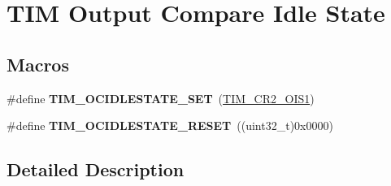 \hypertarget{group___t_i_m___output___compare___idle___state}{}\section{T\+IM Output Compare Idle State}
\label{group___t_i_m___output___compare___idle___state}
\subsection*{Macros}
\begin{DoxyCompactItemize}
\item 
\#define {\bfseries T\+I\+M\+\_\+\+O\+C\+I\+D\+L\+E\+S\+T\+A\+T\+E\+\_\+\+S\+ET}~(\hyperlink{group___peripheral___registers___bits___definition_ga31b26bf058f88d771c33aff85ec89358}{T\+I\+M\+\_\+\+C\+R2\+\_\+\+O\+I\+S1})\hypertarget{group___t_i_m___output___compare___idle___state_gad251b83b0e33ddd0ed2fb35aa747ef78}{}\label{group___t_i_m___output___compare___idle___state_gad251b83b0e33ddd0ed2fb35aa747ef78}

\item 
\#define {\bfseries T\+I\+M\+\_\+\+O\+C\+I\+D\+L\+E\+S\+T\+A\+T\+E\+\_\+\+R\+E\+S\+ET}~((uint32\+\_\+t)0x0000)\hypertarget{group___t_i_m___output___compare___idle___state_ga56505fe4142096454f1da97683ce8bc2}{}\label{group___t_i_m___output___compare___idle___state_ga56505fe4142096454f1da97683ce8bc2}

\end{DoxyCompactItemize}


\subsection{Detailed Description}
